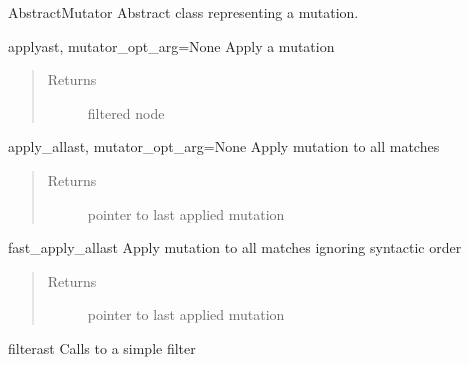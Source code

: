 \documentclass[a4paper,10pt,english]{manual}
\begin{document}
\hypertarget{Backends.Common.Mutators.AbstractMutator.AbstractMutator}{}\begin{classdesc}{AbstractMutator}{}
Abstract class representing a mutation.

\hypertarget{Backends.Common.Mutators.AbstractMutator.AbstractMutator.apply}{}\begin{methoddesc}{apply}{ast, mutator\_opt\_arg=None}
Apply a mutation
\begin{quote}\begin{description}
\item[Returns] \leavevmode
filtered node

\end{description}\end{quote}
\end{methoddesc}

\hypertarget{Backends.Common.Mutators.AbstractMutator.AbstractMutator.apply\_all}{}\begin{methoddesc}{apply\_all}{ast, mutator\_opt\_arg=None}
Apply mutation to all matches
\begin{quote}\begin{description}
\item[Returns] \leavevmode
pointer to last applied mutation

\end{description}\end{quote}
\end{methoddesc}

\hypertarget{Backends.Common.Mutators.AbstractMutator.AbstractMutator.fast\_apply\_all}{}\begin{methoddesc}{fast\_apply\_all}{ast}
Apply mutation to all matches ignoring syntactic order
\begin{quote}\begin{description}
\item[Returns] \leavevmode
pointer to last applied mutation

\end{description}\end{quote}
\end{methoddesc}

\hypertarget{Backends.Common.Mutators.AbstractMutator.AbstractMutator.filter}{}\begin{methoddesc}{filter}{ast}
Calls to a simple filter
\end{methoddesc}


\end{classdesc}
\end{document}
